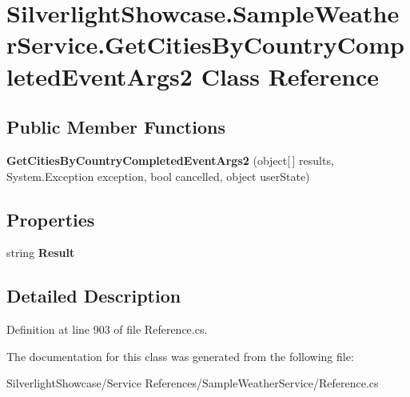 \hypertarget{class_silverlight_showcase_1_1_sample_weather_service_1_1_get_cities_by_country_completed_event_args2}{
\section{SilverlightShowcase.SampleWeatherService.GetCitiesByCountryCompletedEventArgs2 Class Reference}
\label{class_silverlight_showcase_1_1_sample_weather_service_1_1_get_cities_by_country_completed_event_args2}
}
\subsection*{Public Member Functions}
\begin{DoxyCompactItemize}
\item 
\hypertarget{class_silverlight_showcase_1_1_sample_weather_service_1_1_get_cities_by_country_completed_event_args2_aa0231e054c2aa6753c1ab721b978a2ba}{
{\bfseries GetCitiesByCountryCompletedEventArgs2} (object\mbox{[}$\,$\mbox{]} results, System.Exception exception, bool cancelled, object userState)}
\label{class_silverlight_showcase_1_1_sample_weather_service_1_1_get_cities_by_country_completed_event_args2_aa0231e054c2aa6753c1ab721b978a2ba}

\end{DoxyCompactItemize}
\subsection*{Properties}
\begin{DoxyCompactItemize}
\item 
\hypertarget{class_silverlight_showcase_1_1_sample_weather_service_1_1_get_cities_by_country_completed_event_args2_a7ae898532405b77185e3495c2100f06b}{
string {\bfseries Result}}
\label{class_silverlight_showcase_1_1_sample_weather_service_1_1_get_cities_by_country_completed_event_args2_a7ae898532405b77185e3495c2100f06b}

\end{DoxyCompactItemize}


\subsection{Detailed Description}


Definition at line 903 of file Reference.cs.

The documentation for this class was generated from the following file:\begin{DoxyCompactItemize}
\item 
SilverlightShowcase/Service References/SampleWeatherService/Reference.cs\end{DoxyCompactItemize}
